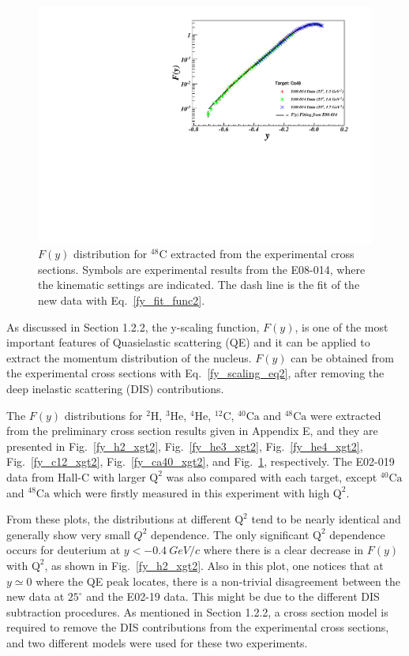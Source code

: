  \begin{figure}[!ht]
  \begin{center}
    \includegraphics[type=pdf,ext=.pdf,read=.pdf,width=.90\textwidth]{./figures/xs/Ca48_XGT2_Fy}
    \caption[$F(y)$ distribution for $\mathrm{^{48}Ca}$]{\footnotesize{$F(y)$ distribution for $\mathrm{^{48}C}$ extracted from the experimental cross sections. Symbols are experimental results from the E08-014, where the kinematic settings are indicated. The dash line is the fit of the new data with Eq.~\eqref{fy_fit_func2}.}}
    \label{fy_ca48_xgt2}
  \end{center}
\end{figure}
  As discussed in Section 1.2.2, the y-scaling function, $F(y)$, is one of the most important features of Quasielastic scattering (QE) and it can be applied to extract the momentum distribution of the nucleus. $F(y)$ can be obtained from the experimental cross sections with Eq.~\eqref{fy_scaling_eq2}, after removing the deep inelastic scattering (DIS) contributions. 
   
  The $F(y)$ distributions for $\mathrm{^{2}H}$, $\mathrm{^{3}He}$, $\mathrm{^{4}He}$, $\mathrm{^{12}C}$, $\mathrm{^{40}Ca}$ and $\mathrm{^{48}Ca}$ were extracted from the preliminary cross section results given in Appendix E, and they are presented in Fig.~\ref{fy_h2_xgt2}, Fig.~\ref{fy_he3_xgt2}, Fig.~\ref{fy_he4_xgt2}, Fig.~\ref{fy_c12_xgt2}, Fig.~\ref{fy_ca40_xgt2}, and Fig.~\ref{fy_ca48_xgt2}, respectively. The E02-019 data from Hall-C with larger $\mathrm{Q^{2}}$ was also compared with each target, except $\mathrm{^{40}Ca}$ and $\mathrm{^{48}Ca}$ which were firstly measured in this experiment with high $\mathrm{Q^{2}}$.
  
   From these plots, the distributions at different $\mathrm{Q^{2}}$ tend to be nearly identical and generally show very small $Q^{2}$ dependence. The only significant $\mathrm{Q^{2}}$ dependence occurs for deuterium at $y<-0.4~GeV/c$ where there is a clear decrease in $F(y)$ with $\mathrm{Q^{2}}$, as shown in Fig.~\ref{fy_h2_xgt2}. Also in this plot, one notices that at $y\simeq 0$ where the QE peak locates, there is a non-trivial disagreement between the new data at $25^{\circ}$ and the E02-19 data. This might be due to the different DIS subtraction procedures. As mentioned in Section 1.2.2, a cross section model is required to remove the DIS contributions from the experimental cross sections, and two different models were used for these two experiments.
 
